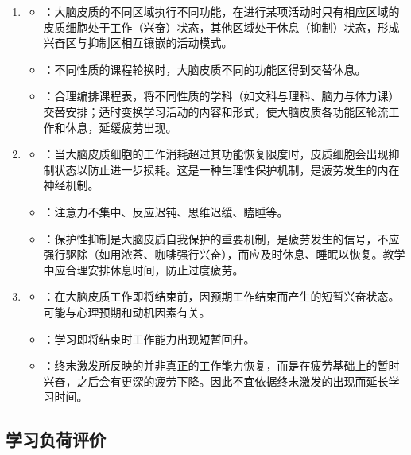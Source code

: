 \begin{keybox}
\begin{enumerate}[leftmargin=*]
    \item {}
    \begin{itemize}
        \item {}：大脑皮质的不同区域执行不同功能，在进行某项活动时只有相应区域的皮质细胞处于工作（兴奋）状态，其他区域处于休息（抑制）状态，形成兴奋区与抑制区相互镶嵌的活动模式。
        \item {}：不同性质的课程轮换时，大脑皮质不同的功能区得到交替休息。
        \item {}：合理编排课程表，将不同性质的学科（如文科与理科、脑力与体力课）交替安排；适时变换学习活动的内容和形式，使大脑皮质各功能区轮流工作和休息，延缓疲劳出现。
    \end{itemize}

    \item {}
    \begin{itemize}
        \item {}：当大脑皮质细胞的工作消耗超过其功能恢复限度时，皮质细胞会出现抑制状态以防止进一步损耗。这是一种生理性保护机制，是疲劳发生的内在神经机制。
        \item {}：注意力不集中、反应迟钝、思维迟缓、瞌睡等。
        \item {}：保护性抑制是大脑皮质自我保护的重要机制，是疲劳发生的信号，不应强行驱除（如用浓茶、咖啡强行兴奋），而应及时休息、睡眠以恢复。教学中应合理安排休息时间，防止过度疲劳。
    \end{itemize}

    \item {}
    \begin{itemize}
        \item {}：在大脑皮质工作即将结束前，因预期工作结束而产生的短暂兴奋状态。可能与心理预期和动机因素有关。
        \item {}：学习即将结束时工作能力出现短暂回升。
        \item {}：终末激发所反映的并非真正的工作能力恢复，而是在疲劳基础上的暂时兴奋，之后会有更深的疲劳下降。因此不宜依据终末激发的出现而延长学习时间。
    \end{itemize}
\end{enumerate}
\end{keybox}

\subsection{学习负荷评价}

